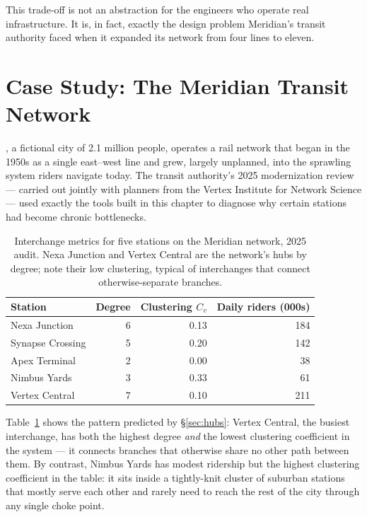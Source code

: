 \documentclass{tufte-book}
\begin{document}
This trade-off is not an abstraction for the engineers who operate real
infrastructure. It is,
in fact, exactly the design problem Meridian's transit authority faced when it
expanded its network from four lines to eleven.

\section{Case Study: The Meridian Transit Network}
\label{sec:meridian}

, a fictional city of 2.1 million people, operates a rail
network that began in the 1950s as a single east--west line and grew, largely
unplanned, into the sprawling system riders navigate today. The transit authority's
2025 modernization review --- carried out jointly with planners from the Vertex
Institute for Network Science --- used exactly the tools built in this chapter to
diagnose why certain stations had become chronic bottlenecks.

\begin{table}[h]
\centering
\small
\begin{tabular}{lrrr}
\toprule
Station & Degree & Clustering $C_v$ & Daily riders (000s) \\
\midrule
Nexa Junction     & 6 & 0.13 & 184 \\
Synapse Crossing  & 5 & 0.20 & 142 \\
Apex Terminal     & 2 & 0.00 & 38  \\
Nimbus Yards      & 3 & 0.33 & 61  \\
Vertex Central    & 7 & 0.10 & 211 \\
\bottomrule
\end{tabular}
\caption{Interchange metrics for five stations on the Meridian network, 2025 audit.
Nexa Junction and Vertex Central are the network's hubs by degree; note their low
clustering, typical of interchanges that connect otherwise-separate branches.}
\label{tab:meridian-stations}
\end{table}

Table~\ref{tab:meridian-stations} shows the pattern predicted by
\S\ref{sec:hubs}: Vertex Central, the busiest interchange, has both the highest
degree \emph{and} the lowest clustering coefficient in the system --- it connects
branches that otherwise share no other path between them.  By contrast, Nimbus
Yards has modest ridership but the highest clustering coefficient in the table: it
sits inside a tightly-knit cluster of suburban stations that mostly serve each
other and rarely need to reach the rest of the city through any single choke point.
\end{document}
